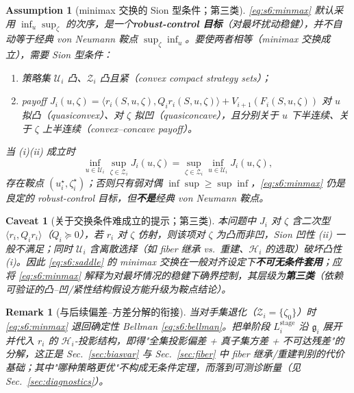 \documentclass[11pt,a4paper]{article}
\newtheorem{remark}[theorem]{Remark}
\newtheorem{caveat}[theorem]{Caveat}
\newtheorem{assumption}[theorem]{Assumption}
\newcommand{\cH}{\mathcal{H}}   %
\newcommand{\cU}{\mathcal{U}}   %
\newcommand{\cZ}{\mathcal{Z}}
\newcommand{\gres}{\bm{\mathfrak{g}}} %
\begin{document}
\begin{assumption}[minimax 交换的 Sion 型条件；第三类]\label{asm:s6:sion}
\eqref{eq:s6:minmax} 默认采用 $\inf_u\sup_\zeta$ 的次序，是一个\textbf{robust-control 目标}（对最坏扰动稳健），\emph{并不}自动等于经典 von Neumann 鞍点 $\sup_\zeta\inf_u$。要使两者相等（minimax 交换成立），需要 Sion 型条件：
\begin{enumerate}[label=(\roman*)]
\item 策略集 $\cU_i$ 凸、$\cZ_i$ 凸且紧（convex compact strategy sets）；
\item payoff $J_i(u,\zeta)=\langle r_i(S,u,\zeta),Q_i r_i(S,u,\zeta)\rangle+V_{i+1}(F_i(S,u,\zeta))$ 对 $u$ 拟凸（quasiconvex）、对 $\zeta$ 拟凹（quasiconcave），且分别关于 $u$ 下半连续、关于 $\zeta$ 上半连续（convex--concave payoff）。
\end{enumerate}
当 (i)(ii) 成立时
\begin{equation}\label{eq:s6:saddle}
\inf_{u\in\cU_i}\sup_{\zeta\in\cZ_i}J_i(u,\zeta)=\sup_{\zeta\in\cZ_i}\inf_{u\in\cU_i}J_i(u,\zeta),
\end{equation}
存在鞍点 $(u_i^\star,\zeta_i^\star)$；否则只有弱对偶 $\inf\sup\ge\sup\inf$，\eqref{eq:s6:minmax} 仍是良定的 robust-control 目标，但\textbf{不是}经典 von Neumann 鞍点。
\end{assumption}

\begin{caveat}[关于交换条件难成立的提示；第三类]\label{cav:s6:nonconvex}
本问题中 $J_i$ 对 $\zeta$ 含二次型 $\langle r_i,Q_i r_i\rangle$（$Q_i\succeq0$），若 $r_i$ 对 $\zeta$ 仿射，则该项对 $\zeta$ 为凸而非凹，Sion 凹性 (ii) 一般\emph{不}满足；同时 $\cU_i$ 含离散选择（如 fiber 继承 vs.\ 重建、$\cH_i$ 的选取）破坏凸性 (i)。因此 \eqref{eq:s6:saddle} 的 minimax 交换在一般对齐设定下\textbf{不可无条件套用}；应将 \eqref{eq:s6:minmax} 解释为对最坏情况的稳健下确界控制，其层级为\textbf{第三类}（依赖可验证的凸--凹/紧性结构假设方能升级为鞍点结论）。
\end{caveat}

\begin{remark}[与后续偏差--方差分解的衔接]\label{rem:s6:link}
当对手集退化（$\cZ_i=\{\zeta_0\}$）时 \eqref{eq:s6:minmax} 退回确定性 Bellman \eqref{eq:s6:bellman}。把单阶段 $L_i^{\mathrm{stage}}$ 沿 $\gres_i$ 展开并代入 $r_i$ 的 $\cH_i$-投影结构，即得"全集投影偏差 + 真子集方差 + 不可达残差"的分解，这正是 Sec.~\ref{sec:biasvar} 与 Sec.~\ref{sec:fiber} 中 fiber 继承/重建判别的代价基础；其中"哪种策略更优"不构成无条件定理，而落到可测诊断量（见 Sec.~\ref{sec:diagnostics}）。
\end{remark}
\end{document}
